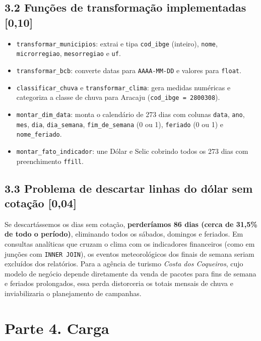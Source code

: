 \documentclass[11pt,a4paper]{article}
\begin{document}
\subsection*{3.2 Funções de transformação implementadas \textnormal{[0,10]}}
\begin{itemize}
    \item \texttt{transformar\_municipios}: extrai e tipa \texttt{cod\_ibge} (inteiro), \texttt{nome}, \texttt{microrregiao}, \texttt{mesorregiao} e \texttt{uf}.
    \item \texttt{transformar\_bcb}: converte datas para \texttt{AAAA-MM-DD} e valores para \texttt{float}.
    \item \texttt{classificar\_chuva} e \texttt{transformar\_clima}: gera medidas numéricas e categoriza a classe de chuva para Aracaju (\texttt{cod\_ibge = 2800308}).
    \item \texttt{montar\_dim\_data}: monta o calendário de 273 dias com colunas \texttt{data}, \texttt{ano}, \texttt{mes}, \texttt{dia}, \texttt{dia\_semana}, \texttt{fim\_de\_semana} (0 ou 1), \texttt{feriado} (0 ou 1) e \texttt{nome\_feriado}.
    \item \texttt{montar\_fato\_indicador}: une Dólar e Selic cobrindo todos os 273 dias com preenchimento \texttt{ffill}.
\end{itemize}

\subsection*{3.3 Problema de descartar linhas do dólar sem cotação \textnormal{[0,04]}}
Se descartássemos os dias sem cotação, \textbf{perderíamos 86 dias (cerca de 31,5\% de todo o período)}, eliminando todos os sábados, domingos e feriados. Em consultas analíticas que cruzam o clima com os indicadores financeiros (como em junções com \texttt{INNER JOIN}), os eventos meteorológicos dos finais de semana seriam excluídos dos relatórios. Para a agência de turismo \textit{Costa dos Coqueiros}, cujo modelo de negócio depende diretamente da venda de pacotes para fins de semana e feriados prolongados, essa perda distorceria os totais mensais de chuva e inviabilizaria o planejamento de campanhas.

\section*{Parte 4. Carga}
\end{document}
